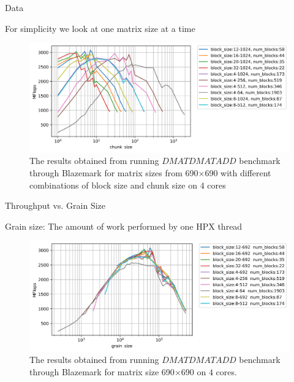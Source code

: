 \documentclass[10pt]{beamer}
\begin{document}
\begin{frame}{Data}
	\begin{outline}
		\1For simplicity we look at one matrix size at a time
		
		
		\begin{figure}
			\includegraphics[width=0.9\linewidth]{images/fig5.png}	
			\caption{The results obtained from running $DMATDMATADD$ benchmark through Blazemark for matrix sizes from 690$\times$690 with different combinations of block size and chunk size on $4$ cores}	
		\end{figure}
	\end{outline}
\end{frame}


\begin{frame}{Throughput vs. Grain Size}
	\begin{outline}
		Grain size: The amount of work performed by one HPX thread
		
		\begin{figure}[H]
			\centering\includegraphics[width=1\linewidth]{images/fig6.png}
			\caption{The results obtained from running $DMATDMATADD$ benchmark through Blazemark for matrix size 690$\times$690 on $4$ cores.}	
			\label{fig6}
		\end{figure}
	
	\end{outline}
\end{frame}
\end{document}
